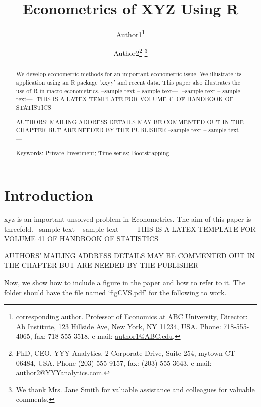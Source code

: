 \documentclass[12pt]{article}
\title{Econometrics of XYZ Using R}
\author{ {Author1}\footnote{corresponding author. 
 Professor of Economics at ABC University, 
Director:  Ab Institute, 123 Hillside Ave, New York, NY 11234, USA. Phone: 718-555-4065, fax: 718-555-3518, e-mail: \url{author1@ABC.edu}.} 
\and 
{Author2}\footnote{PhD, CEO, YYY Analytics. 2 Corporate Drive, Suite 254, mytown CT 06484, USA. Phone (203) 555 9157, fax: (203) 555 3643, e-mail: \url{author2@YYYanalytics.com}.}
\thanks{We thank Mrs. Jane Smith for valuable assistance and colleagues for valuable comments.} 
} %
\begin{document}


\maketitle

\begin{abstract}
We develop econometric methods for an  important
econometric issue.
We illustrate its application using an R package `xxyy'
and recent data.
This paper also illustrates the use of R in macro-econometrics.
--sample text -- sample text----
--sample text -- sample text----
THIS IS A LATEX TEMPLATE FOR VOLUME 41 OF HANDBOOK OF STATISTICS


AUTHORS' MAILING ADDRESS DETAILS MAY BE COMMENTED OUT IN THE CHAPTER
 BUT ARE NEEDED BY THE PUBLISHER
 --sample text -- sample text----

\bigskip

Keywords: Private Investment; Time series; Bootstrapping


\end{abstract}

\section{Introduction}
xyz is an important unsolved problem in Econometrics.
The aim of this paper is threefold.
--sample text -- sample text----
--
THIS IS A LATEX TEMPLATE FOR VOLUME 41 OF HANDBOOK OF STATISTICS

AUTHORS' MAILING  ADDRESS DETAILS MAY BE COMMENTED OUT IN THE CHAPTER BUT ARE NEEDED BY THE PUBLISHER

Now, we show how to include a figure in the paper and
how to refer to it.  The folder should have the 
file named `figCVS.pdf' for the following to work.
\end{document}
